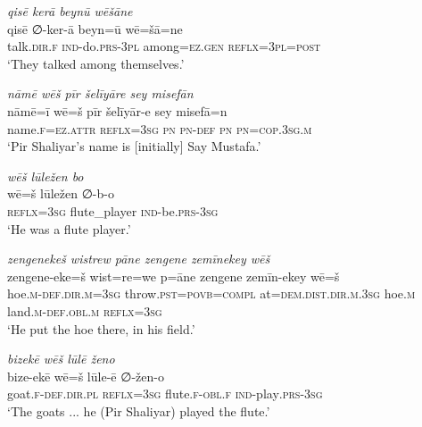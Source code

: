 \ea \label{ZP.114}
\textit{qisē kerā beynū wēšāne} \\ 
\gll qisē ∅-ker-ā beyn=ū wē=šā=ne \\ 
 talk\textsc{.dir}\textsc{.f} \textsc{ind-}do\textsc{.prs}\textsc{-3pl} among\textsc{\textsc{=ez.gen}} \textsc{reflx}\textsc{=3pl}\textsc{=\textsc{post}} \\ 
\glt `They talked among themselves.'
\z 
 
\ea \label{ŽP.2}
\textit{nāmē wēš pīr šelīyāre sey misefān} \\ 
\gll nāmē=ī wē=š pīr šelīyār-e sey misefā=n \\ 
 name\textsc{.f}\textsc{=ez}.\textsc{attr} \textsc{reflx}\textsc{=3sg} \textsc{pn} \textsc{pn}\textsc{-def} \textsc{pn} \textsc{pn}\textsc{=cop}\textsc{.3sg}\textsc{.m} \\ 
\glt `Pir Shaliyar’s name is [initially] Say Mustafa.'
\z 
 
\ea \label{ŽP.33}
\textit{wēš lūležen bo} \\ 
\gll wē=š lūležen ∅-b-o \\ 
 \textsc{reflx}\textsc{=3sg} flute\_player \textsc{ind-}be\textsc{.prs}\textsc{-3sg} \\ 
\glt `He was a flute player.'
\z 
 
\ea \label{ŽP.52}
\textit{zengenekeš wistrew pāne zengene zemīnekey wēš} \\ 
\gll zengene-eke=š wist=re=we p=āne zengene zemīn-ekey wē=š \\ 
 hoe\textsc{.m}\textsc{-def}\textsc{.dir}\textsc{.m}\textsc{=3sg} throw\textsc{.pst}\textsc{=\textsc{povb}}\textsc{=compl} at=\textsc{dem.dist}\textsc{.dir}\textsc{.m}\textsc{.3sg} hoe\textsc{.m} land\textsc{.m}\textsc{-def}\textsc{.obl}\textsc{.m} \textsc{reflx}\textsc{=3sg} \\ 
\glt `He put the hoe there, in his field.'
\z 
 
\ea \label{ŽP.54}
\textit{bizekē wēš lūlē ženo} \\ 
\gll bize-ekē wē=š lūle-ē ∅-žen-o \\ 
 goat\textsc{.f}\textsc{-def}\textsc{.dir}\textsc{.pl} \textsc{reflx}\textsc{=3sg} flute\textsc{.f}\textsc{-obl}\textsc{.f} \textsc{ind-}play\textsc{.prs}\textsc{-3sg} \\ 
\glt `The goats ... he (Pir Shaliyar) played the flute.'
\z 
 
